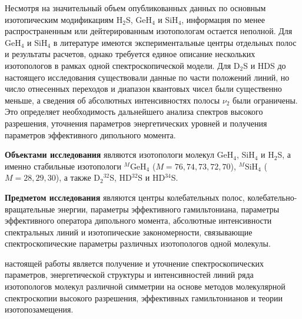 Несмотря на значительный объем опубликованных данных по основным изотопическим модификациям H$_2$S,
GeH$_4$ и SiH$_4$, информация по менее распространенным или дейтерированным изотопологам остается
неполной. Для GeH$_4$ и SiH$_4$ в литературе имеются экспериментальные центры отдельных полос и
результаты расчетов, однако требуется единое описание нескольких изотопологов в рамках одной
спектроскопической модели. Для D$_2$S и HDS до настоящего исследования существовали данные по части
положений линий, но число отнесенных переходов и диапазон квантовых чисел были существенно меньше, а
сведения об абсолютных интенсивностях полосы $\nu_2$ были ограничены. Это определяет необходимость
дальнейшего анализа спектров высокого разрешения, уточнения параметров энергетических уровней и
получения параметров эффективного дипольного момента.

\textbf{Объектами исследования} являются изотопологи молекул GeH$_4$, SiH$_4$ и H$_2$S, а именно
стабильные изотопологи ${}^{M}$GeH$_4$ ($M=76,74,73,72,70$), ${}^{M}$SiH$_4$ ($M=28,29,30$), а также
D$_2{}^{32}$S, HD$^{32}$S и HD$^{34}$S.

\textbf{Предметом исследования} являются центры колебательных полос, колебательно-вращательные
энергии, параметры эффективного гамильтониана, параметры эффективного оператора дипольного момента,
абсолютные интенсивности спектральных линий и изотопические закономерности, связывающие
спектроскопические параметры различных изотопологов одной молекулы.

{\aim} настоящей работы является получение и уточнение спектроскопических параметров, энергетической
структуры и интенсивностей линий ряда изотопологов молекул различной симметрии на основе методов
молекулярной спектроскопии высокого разрешения, эффективных гамильтонианов и теории
изотопозамещения.

